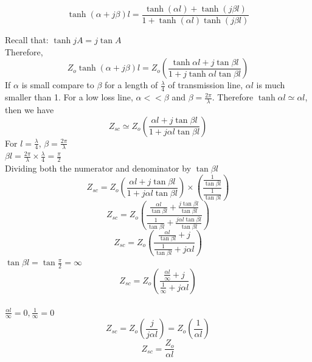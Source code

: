 \begin{equation}
\tanh(\alpha+j\beta)l=\frac{\tanh (\alpha l) + \tanh (j\beta l)}{1 + \tanh (\alpha l)\tanh (j\beta l)}
\end{equation}

Recall that: $ \tanh jA= j\tan A $\\
Therefore,
\begin{equation}
Z_{o}\tanh(\alpha+j\beta)l=Z_{o}\left(\frac{\tanh \alpha l+j\tan \beta l}{1+j\tanh \alpha l\tan \beta l}\right)
\end{equation}
If $ \alpha $ is small compare to $ \beta $ for a length of $ \frac{\lambda}{4} $ of transmission line, $ \alpha l $ is much smaller than 1. For a low loss line, $ \alpha<<\beta $ and $ \beta=\frac{2\pi}{\lambda} $. Therefore	$ \tanh \alpha l \simeq \alpha l $, then we have
\begin{equation}
Z_{sc}\simeq Z_{o}\left(\frac{\alpha l + j \tan \beta l}{1+ j\alpha l \tan\beta l}\right)
\end{equation} 
For $ l=\frac{\lambda}{4} $, $ \beta=\frac{2\pi}{\lambda} $\\
$ \beta l= \frac{2\pi}{\lambda} \times\frac{\lambda}{4} =\frac{\pi}{2} $\\
Dividing both the numerator and denominator by $ \tan\beta l $
\begin{equation}
Z_{sc}=Z_{o}\left(\frac{\alpha l + j \tan \beta l}{1+ j\alpha l \tan\beta l}\right)\times\left(\frac{\frac{1}{\tan \beta l}}{\frac{1}{\tan \beta l}}\right)
\end{equation}
\begin{equation}
Z_{sc}=Z_{o}\left(\frac{\frac{\alpha l}{\tan \beta l}+\frac{j\tan \beta l}{\tan \beta l}}{\frac{1}{\tan \beta l}+\frac{j\alpha l\tan \beta l}{\tan \beta l}}\right)
\end{equation}
\begin{equation}
Z_{sc}=Z_{o}\left(\frac{\frac{\alpha l}{\tan \beta l} + j}{\frac{1}{\tan \beta l} + j\alpha l}\right)
\end{equation}
$ \tan \beta l =\tan\frac{\pi}{2}=\infty $
\begin{equation}
Z_{sc}=Z_{o}\left(\frac{\frac{\alpha l}{\infty} + j}{\frac{1}{\infty} + j \alpha l}\right)
\end{equation}\\
$ \frac{\alpha l}{\infty}=0, \frac{1}{\infty}=0  $
\begin{equation}
Z_{sc}=Z_{o}\left(\frac{j}{j\alpha l}\right)=Z_{o}\left(\frac{1}{\alpha l}\right)
\end{equation}
\begin{equation}
\boxed{Z_{sc}=\frac{Z_{o}}{\alpha l}}	\end{equation}

